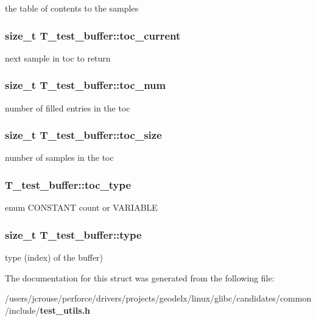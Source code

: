 the table of contents to the samples 
\subsubsection{\setlength{\rightskip}{0pt plus 5cm}size\_\-t T\_\-test\_\-buffer::toc\_\-current}\label{structT__test__buffer_m19}


next sample in toc to return 
\subsubsection{\setlength{\rightskip}{0pt plus 5cm}size\_\-t T\_\-test\_\-buffer::toc\_\-num}\label{structT__test__buffer_m18}


number of filled entries in the toc 
\subsubsection{\setlength{\rightskip}{0pt plus 5cm}size\_\-t T\_\-test\_\-buffer::toc\_\-size}\label{structT__test__buffer_m15}


number of samples in the toc 
\subsubsection{ T\_\-test\_\-buffer::toc\_\-type}\label{structT__test__buffer_m17}


enum CONSTANT count or VARIABLE 
\subsubsection{\setlength{\rightskip}{0pt plus 5cm}size\_\-t T\_\-test\_\-buffer::type}\label{structT__test__buffer_m1}


type (index) of the buffer) 

The documentation for this struct was generated from the following file:\begin{CompactItemize}
\item 
/users/jcrouse/perforce/drivers/projects/geodelx/linux/glibc/candidates/common/include/{\bf test\_\-utils.h}\end{CompactItemize}
